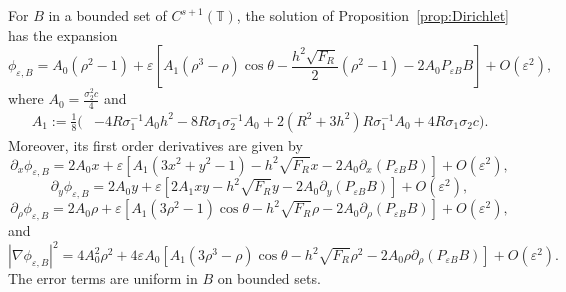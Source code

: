 \documentclass[10pt,a4paper]{amsart}
\begin{document}
 \begin{proposition}\label{prop:first-order-dirichlet-expansion}
 	For $B$ in a bounded set of $C^{s+1}(\mathbb{T})$, the solution of Proposition~\ref{prop:Dirichlet} has the expansion
\begin{equation}\label{eq:phi-expansion}
\phi_{\varepsilon,B}=A_0(\rho^2-1)+\varepsilon\left[A_1(\rho^3-\rho)\cos\theta-\frac{h^2\sqrt{F_R}}{2}(\rho^2-1)-2A_0P_{\varepsilon B}B\right]+O(\varepsilon^2),
\end{equation}
where  $A_0=\frac{\sigma_2^2c}{4}$ and
\begin{align*}\label{eq:A1}
A_1:=\frac18\Big(&-4R\sigma_1^{-1}A_0h^2
-8R\sigma_1\sigma_2^{-1}A_0
+2(R^2+3h^2)R\sigma_1^{-1}A_0 +4R \sigma_1\sigma_2c\Big).
\end{align*} 	
Moreover, its first order derivatives are given by  
\begin{equation}\label{eq:px}
\partial_x\phi_{\varepsilon,B}={} 2A_0x+\varepsilon \left[  A_1(3x^2+y^2-1)-  h^2\sqrt{F_R}x  
-2 A_0\partial_x(P_{\varepsilon B}B)\right] 
+O(\varepsilon^2),\tag{4.1a}
\end{equation}
\begin{equation}\label{eq:py}
\partial_y\phi_{\varepsilon,B}={} 2A_0y+\varepsilon \left [2A_1xy- h^2\sqrt{F_R}y  
-2 A_0\partial_y(P_{\varepsilon B}B)\right ]
+O(\varepsilon^2),\tag{4.1b}
\end{equation}
\begin{equation}\label{eq:prho}
\partial_{\rho}\phi_{\varepsilon,B}={} 2A_0\rho+\varepsilon \left[  A_1(3\rho^2-1)\cos\theta-  h^2\sqrt{F_R}\rho  
-2 A_0\partial_{\rho}(P_{\varepsilon B}B)\right] 
+O(\varepsilon^2),\tag{4.1c}
\end{equation}
and
\begin{equation}\label{eq:Dphi-square}
|\nabla\phi_{\varepsilon,B}|^2=4A_0^2\rho^2+4\varepsilon A_0 
\left[A_1(3\rho^3-\rho)\cos\theta-h^2\sqrt{F_R}\rho^2-2A_0\rho\partial_\rho(P_{\varepsilon B}B)\right]+O(\varepsilon^2).
\tag{4.1d}
\end{equation}
The error terms are uniform in $B$ on bounded sets.
 \end{proposition}
\end{document}
